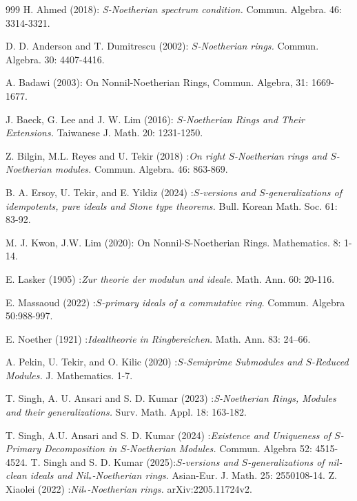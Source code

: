 \documentclass[11pt]{article}
\begin{document}
\begin{thebibliography}{999}
	H. Ahmed (2018): \textit{S-Noetherian spectrum condition.} Commun. Algebra. 46: 3314-3321.
	
D. D. Anderson and T. Dumitrescu (2002): \textit{$S$-Noetherian rings.} Commun. Algebra.  30: 4407-4416.


 A. Badawi (2003): On Nonnil-Noetherian Rings, Commun. Algebra, 31: 1669-1677. 

	J. Baeck, G. Lee and J. W. Lim (2016): \textit{$S$-Noetherian Rings and Their Extensions.} Taiwanese J. Math. 20: 1231-1250.
	
	
	
	Z. Bilgin, M.L. Reyes and U. Tekir (2018) :\textit{On right $S$-Noetherian rings and $S$-Noetherian modules.} Commun. Algebra. 46: 863-869.
	
	
	B. A. Ersoy, U. Tekir, and E. Yildiz (2024) :\textit{$S$-versions and $S$-generalizations of idempotents, pure ideals and Stone type theorems.} Bull. Korean Math. Soc. 61: 83-92.
	
	
	 M. J. Kwon, J.W. Lim (2020):	On Nonnil-S-Noetherian Rings. Mathematics. 8: 1-14.
	
	E. Lasker (1905) :\textit{Zur theorie der modulun and ideale}. Math. Ann. 60: 20-116.
	
	
	

	E. Massaoud (2022) :\textit{$S$-primary ideals of a commutative ring}. Commun. Algebra 50:988-997.
	


E. Noether (1921) :\textit{Idealtheorie in Ringbereichen}. Math. Ann.  83: 24--66.

   
A. Pekin, U. Tekir, and O. Kilic  (2020) :\textit{$S$-Semiprime Submodules and $S$-Reduced Modules.} J. Mathematics. 1-7.

    
    T. Singh, A. U. Ansari and S. D. Kumar (2023) :\textit{S-Noetherian Rings, Modules and their generalizations.} Surv. Math. Appl.  18: 163-182.
    
    T. Singh, A.U. Ansari and  S. D. Kumar (2024) :\textit{Existence and Uniqueness of $S$-Primary Decomposition in $S$-Noetherian Modules.} Commun. Algebra 52: 4515-4524.
   T. Singh and S. D. Kumar (2025):\textit{$S$-versions and $S$-generalizations of nil-clean ideals and Nil$_{*}$-Noetherian rings.} Asian-Eur. J. Math. 25: 2550108-14.
   Z. Xiaolei (2022) :\textit{Nil$_{*}$-Noetherian rings.} arXiv:2205.11724v2.
  
\end{thebibliography}
\end{document}

